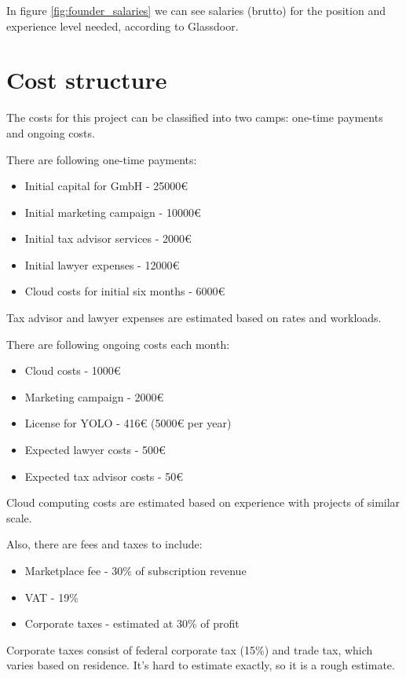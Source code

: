 In figure \ref{fig:founder_salaries} we can see salaries (brutto) for the position and experience level needed, according to Glassdoor.

\section{Cost structure}

The costs for this project can be classified into two camps: one-time payments and ongoing costs.

\p
There are following one-time payments:

\begin{itemize}
    \item Initial capital for GmbH - 25000€
    \item Initial marketing campaign - 10000€
    \item Initial tax advisor services - 2000€
    \item Initial lawyer expenses - 12000€
    \item Cloud costs for initial six months - 6000€
\end{itemize}

Tax advisor and lawyer expenses are estimated based on rates and workloads.

\p
There are following ongoing costs each month:

\begin{itemize}
    \item Cloud costs - 1000€
    \item Marketing campaign - 2000€
    \item License for YOLO - 416€ (5000€ per year)
    \item Expected lawyer costs - 500€
    \item Expected tax advisor costs - 50€
\end{itemize}

Cloud computing costs are estimated based on experience with projects of similar scale.

\p
Also, there are fees and taxes to include:

\begin{itemize}
    \item Marketplace fee - 30\% of subscription revenue
    \item VAT - 19\%
    \item Corporate taxes - estimated at 30\% of profit
\end{itemize}

Corporate taxes consist of federal corporate tax (15\%) and trade tax, which varies based on residence. It's hard to estimate exactly, so it is a rough estimate.

